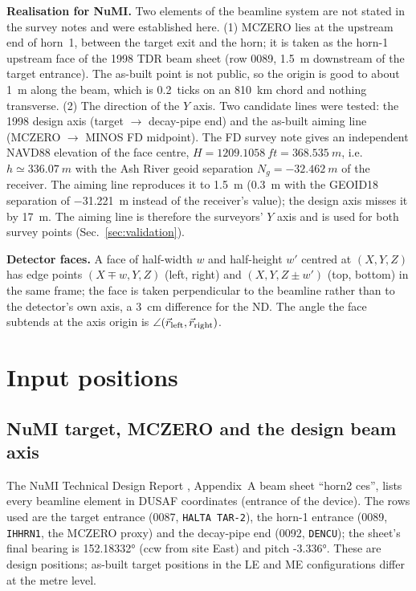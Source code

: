 \documentclass[11pt,letterpaper]{article}
\newcommand{\ND}{ND}
\newcommand{\FD}{FD}
\newcommand{\code}[1]{\texttt{#1}}
\begin{document}
\textbf{Realisation for NuMI.}  Two elements of the beamline system are not stated in the survey notes and were established here.  (1) MCZERO lies at the upstream end of horn~1, between the target exit and the horn; it is taken as the horn-1 upstream face of the 1998 TDR beam sheet (row 0089, \SI{1.5}{m} downstream of the target entrance).  The as-built point is not public, so the origin is good to about \SI{1}{m} along the beam, which is \SI{0.2}{ticks} on an \SI{810}{km} chord and nothing transverse.  (2) The direction of the $Y$ axis.  Two candidate lines were tested: the 1998 design axis (target $\to$ decay-pipe end) and the as-built aiming line (MCZERO $\to$ MINOS \FD{} midpoint).  The \FD{} survey note gives an independent NAVD88 elevation of the face centre, $H=\SI{1209.1058}{ft}=\SI{368.535}{m}$, i.e.\ $h\simeq\SI{336.07}{m}$ with the Ash River geoid separation $N_g=\SI{-32.462}{m}$ of the receiver.  The aiming line reproduces it to \SI{+1.5}{m} (\SI{+0.3}{m} with the GEOID18 separation of \SI{-31.221}{m} instead of the receiver's value); the design axis misses it by \SI{17}{m}.  The aiming line is therefore the surveyors' $Y$ axis and is used for both survey points (Sec.~\ref{sec:validation}).

\textbf{Detector faces.}  A face of half-width $w$ and half-height $w'$ centred at $(X,Y,Z)$ has edge points $(X\mp w,Y,Z)$ (left, right) and $(X,Y,Z\pm w')$ (top, bottom) in the same frame; the face is taken perpendicular to the beamline rather than to the detector's own axis, a \SI{3}{cm} difference for the \ND.  The angle the face subtends at the axis origin is $\angle(\vec r_{\rm left},\vec r_{\rm right})$.

\section{Input positions}
\subsection{NuMI target, MCZERO and the design beam axis}
The NuMI Technical Design Report \cite{numitdr1998}, Appendix~A beam sheet ``horn2 ces'', lists every beamline element in DUSAF coordinates (entrance of the device).  The rows used are the target entrance (0087, \code{HALTA TAR-2}), the horn-1 entrance (0089, \code{IHHRN1}, the MCZERO proxy) and the decay-pipe end (0092, \code{DENCU}); the sheet's final bearing is \ang{152.18332} (ccw from site East) and pitch \ang{-3.336}.  These are design positions; as-built target positions in the LE and ME configurations differ at the metre level.
\end{document}
